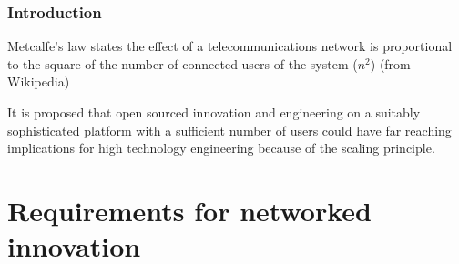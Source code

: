 \documentclass{beamer}
\begin{document}
\begin{frame}
\frametitle{Introduction}

Metcalfe's law states the effect of a telecommunications network is proportional to the square of the number of connected users of the system ($n^2$) (from Wikipedia)

It is proposed that open sourced innovation and engineering on a suitably sophisticated platform with a sufficient number of users could have far reaching implications for high technology engineering because of the scaling principle.

\end{frame}

\section{Requirements for networked innovation} %
\end{document}
